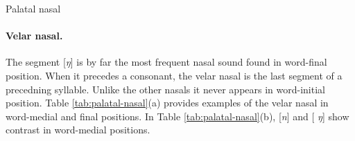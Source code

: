 \begin{table}[!htb] \small
\centering
\caption{Palatal nasal\label{tab:palatal-nasal}}

\quad
{}
\end{table}

\paragraph{Velar nasal.}
\label{sec:velar-nasal}

The segment [{\it ŋ}] is by far 
the most frequent nasal sound found in word-final position.  When it precedes a 
consonant, the velar nasal is  the last segment of  a precedning syllable.  
Unlike the other nasals it never appears in word-initial position. Table 
\ref{tab:palatal-nasal}(a)  provides  examples of the velar nasal in word-medial 
and final positions. In Table \ref{tab:palatal-nasal}(b),   [{\it n}] and [{\it 
ŋ}] show contrast in word-medial  positions. 

